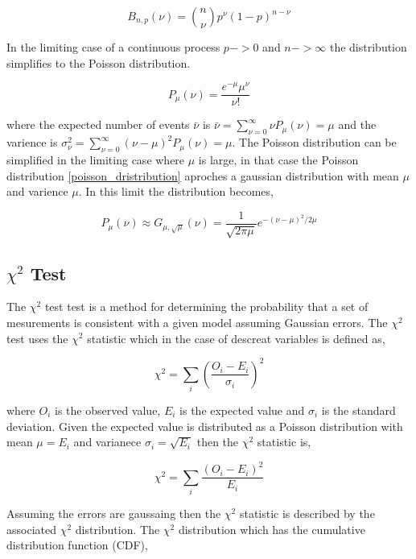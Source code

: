 \documentclass[%
 reprint,
 amsmath,amssymb,
 aps,
]{revtex4-1}
\begin{document}
\[
B_{n,p}(\nu)={n \choose \nu}p^\nu(1-p)^{n-\nu}
\]

In the limiting case of a continuous process $p -> 0$ and $n -> \infty$ the distribution simplifies to the Poisson distribution.

\begin{equation}
P_\mu(\nu)=\frac{e^{-\mu}\mu^\nu}{\nu!}
\label{poisson_dristribution}
\end{equation}

where the expected number of events $\bar{\nu}$ is $\bar{\nu}=\sum_{\nu=0}^\infty \nu P_\mu(\nu)=\mu$ and the varience is $\sigma_\nu^2=\sum_{\nu=0}^\infty(\nu-\mu)^2P_\mu(\nu) = \mu$. The Poisson distribution can be simplified in the limiting case where $\mu$ is large, in that case the Poisson distribution \eqref{poisson_dristribution} aproches a gaussian distribution with mean $\mu$ and varience $\mu$. In this limit the distribution becomes,

\begin{equation}
P_\mu(\nu)\approx G_{\mu, \sqrt{\mu}}(\nu)=\frac{1}{\sqrt{2\pi\mu}}e^{-(\nu-\mu)^2/2\mu}
\label{poisson_gaussian_limit}
\end{equation}

\subsection{$\chi^2$ Test}
The $\chi^2$ test test is a method for determining the probability that a set of mesurements is consistent with a given model assuming Gaussian errors. The $\chi^2$ test uses the $\chi^2$ statistic which in the case of descreat variables is defined as,

\[
\chi^2=\sum_{i}\left(\frac{O_i - E_i}{\sigma_i}\right)^2
\]

where $O_i$ is the observed value, $E_i$ is the expected value and $\sigma_i$ is the standard deviation. Given the expected value is distributed as a Poisson distribution with mean $\mu=E_i$ and varianece $\sigma_i=\sqrt{E_i}$ then the $\chi^2$ statistic is,

\begin{equation}
\chi^2=\sum_{i}\frac{\left(O_i - E_i\right)^2}{E_i}
\label{chi_squared_statistic}
\end{equation}

Assuming the errors are gaussaing then the $\chi^2$ statistic is described by the associated $\chi^2$ distribution. The $\chi^2$ distribution which has the cumulative distribution function (CDF),
\end{document}
